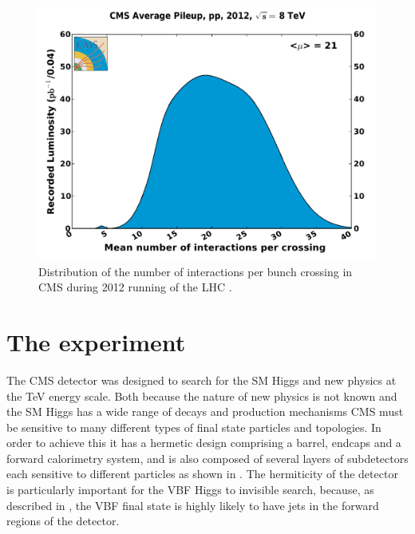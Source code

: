 \begin{figure}
  \includegraphics[width=1.2\largefigwidth]{plots/detector/pileup_pp_2012.pdf}
  \caption{Distribution of the number of interactions per bunch crossing in CMS during 2012 running of the LHC \cite{CMSLumiPublic}.}
  \label{fig:pusummary}
\end{figure}


\section{The \CMS experiment}
\label{sec:CMSInDetail}
The CMS detector was designed to search for the SM Higgs and new physics at the TeV energy scale. Both because the nature of new physics is not known and the SM Higgs has a wide range of decays and production mechanisms CMS must be sensitive to many different types of final state particles and topologies. In order to achieve this it has a hermetic design comprising a barrel, endcaps and a forward calorimetry system, and is also composed of several layers of subdetectors each sensitive to different particles as shown in . The hermiticity of the detector is particularly important for the VBF Higgs to invisible search, because, as described in , the VBF final state is highly likely to have jets in the forward regions of the detector.

